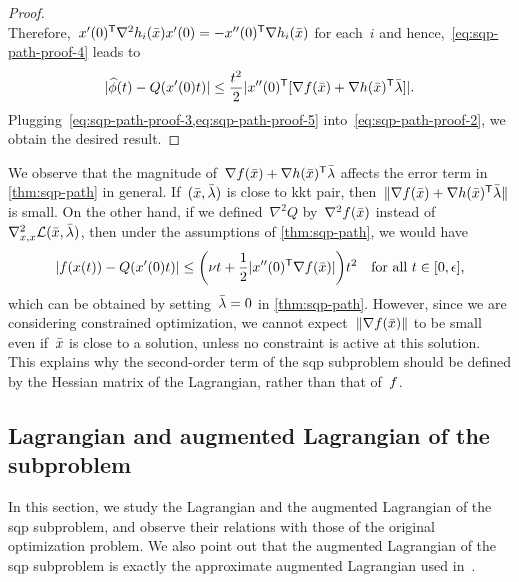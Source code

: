 \begin{proof}
\begin{equation*}
    \end{equation*}
    Therefore,~$\iter'(0)^{\T} \nabla^2 h_i(\bar{\iter}) \iter'(0) = -\iter''(0)^{\T} \nabla h_i(\bar{\iter})$ for each~$i$ and hence,~\cref{eq:sqp-path-proof-4} leads to
    \begin{equation}
        \label{eq:sqp-path-proof-5}
        \abs{\widehat{\phi}(t) - Q(x'(0) t)} \le \frac{t^2}{2} \abs{\iter''(0)^{\T} [\nabla \obj(\bar{\iter}) + \nabla h(\bar{\iter})^{\T} \bar{\lm}]}.
    \end{equation}
    Plugging~\cref{eq:sqp-path-proof-3,eq:sqp-path-proof-5} into~\cref{eq:sqp-path-proof-2}, we obtain the desired result.
\end{proof}
We observe that the magnitude of~$\nabla \obj(\bar{\iter}) + \nabla h(\bar{\iter})^{\T} \bar{\lm}$ affects the error term in \cref{thm:sqp-path} in general.
If~$(\bar{\iter}, \bar{\lm})$ is close to \gls{kkt} pair, then~$\norm{\nabla \obj(\bar{\iter}) + \nabla h(\bar{\iter})^{\T} \bar{\lm}}$ is small.
On the other hand, if we defined~$\nabla^2 Q$ by~$\nabla^2 f(\bar{x})$ instead of~$\nabla_{x, x}^2 \lag(\bar{\iter}, \bar{\lm})$, then under the assumptions of \cref{thm:sqp-path}, we would have
\begin{equation*}
    \abs{\obj(\iter(t)) - Q(x'(0) t)} \le \bigg( \nu t + \frac{1}{2}\abs{\iter''(0)^{\T} \nabla \obj(\bar{\iter})} \bigg) t^2 \quad \text{for all~$t \in [0, \epsilon]$,}
\end{equation*}
which can be obtained by setting~$\bar{\lm} = 0$ in \cref{thm:sqp-path}.
However, since we are considering constrained optimization, we cannot expect~$\norm{\nabla \obj(\bar{\iter})}$ to be small even if~$\bar{\iter}$ is close to a solution, unless no constraint is active at this solution.
This explains why the second-order term of the \gls{sqp} subproblem should be defined by the Hessian matrix of the Lagrangian, rather than that of~$f$.

\subsection{Lagrangian and augmented Lagrangian of the  subproblem}
\label{subsec:lagrangian-augmented-lagrangian}

In this section, we study the Lagrangian and the augmented Lagrangian of the \gls{sqp} subproblem, and observe their relations with those of the original optimization problem.
We also point out that the augmented Lagrangian of the \gls{sqp} subproblem is exactly the approximate augmented Lagrangian used in~\cite{Niu_Yuan_2010,Wang_Yuan_2014}.


